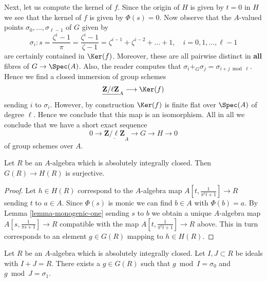 \noindent
Next, let us compute the kernel of $f$. Since the origin of $H$ is
given by $t = 0$ in $H$ we see that the kernel of $f$ is given
by $\Phi(s) = 0$. Now observe that the $A$-valued points
$\sigma_0, \ldots, \sigma_{\ell - 1}$
of $G$ given by
$$
\sigma_i :
s = \frac{\zeta^i - 1}{\pi} = \frac{\zeta^i - 1}{\zeta - 1} =
\zeta^{i - 1} + \zeta^{i - 2} + \ldots + 1,\quad
i = 0, 1, \ldots, \ell - 1
$$
are certainly contained in $\Ker(f)$. Moreover, these are all pairwise
distinct in {\bf all} fibres of $G \to \Spec(A)$. Also, the reader
computes that $\sigma_i +_G \sigma_j = \sigma_{i + j \bmod \ell}$.
Hence we find a closed immersion of group schemes
$$
\underline{\mathbf{Z}/\ell \mathbf{Z}}_A \longrightarrow \Ker(f)
$$
sending $i$ to $\sigma_i$. However, by construction $\Ker(f)$
is finite flat over $\Spec(A)$ of degree $\ell$. Hence we conclude
that this map is an isomorphism. All in all we conclude that
we have a short exact sequence
\begin{equation}
\label{equation-ses}
0 \to
\underline{\mathbf{Z}/\ell \mathbf{Z}}_A
\to G
\to H
\to 0
\end{equation}
of group schemes over $A$.

\begin{lemma}
\label{lemma-lift-points-H-to-G}
Let $R$ be an $A$-algebra which is absolutely integrally closed. Then
$G(R) \to H(R)$ is surjective.
\end{lemma}

\begin{proof}
Let $h \in H(R)$ correspond to the $A$-algebra map
$A[t, \frac{1}{\pi^\ell t + 1}] \to R$ sending $t$ to $a \in A$.
Since $\Phi(s)$ is monic we can find $b \in A$
with $\Phi(b) = a$. By Lemma \ref{lemma-monogenic-one}
sending $s$ to $b$ we obtain a unique $A$-algebra map
$A[s, \frac{1}{\pi s + 1}] \to R$ compatible
with the map $A[t, \frac{1}{\pi^\ell t + 1}] \to R$ above.
This in turn corresponds to an element $g \in G(R)$
mapping to $h \in H(R)$.
\end{proof}

\begin{lemma}
\label{lemma-interpolate}
Let $R$ be an $A$-algebra which is absolutely integrally closed.
Let $I, J \subset R$ be ideals with $I + J = R$.
There exists a $g \in G(R)$ such
that $g \bmod I = \sigma_0$ and $g \bmod J = \sigma_1$.
\end{lemma}

